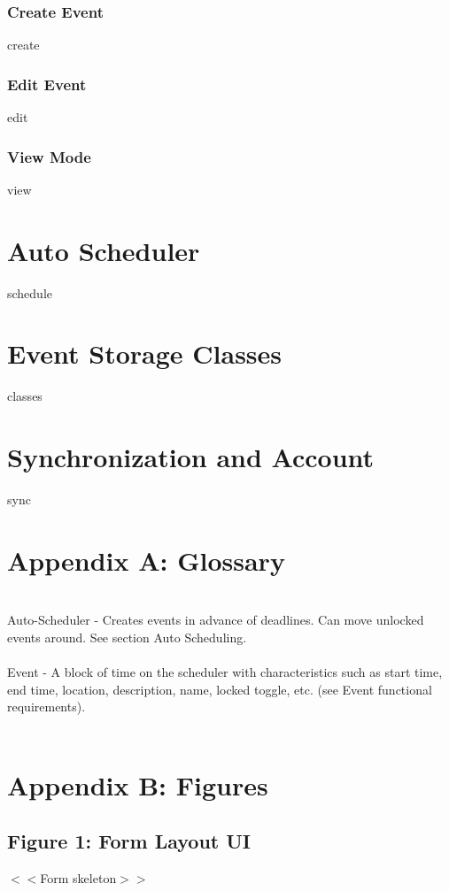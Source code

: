 \documentclass{scrreprt}
\begin{document}
\subsection{Create Event}

create

\subsection{Edit Event}

edit

\subsection{View Mode}

view

\chapter{Auto Scheduler}

schedule

\chapter{Event Storage Classes}

classes

\chapter{Synchronization and Account}

sync

\chapter{Appendix A: Glossary}
\\
Auto-Scheduler - Creates events in advance of deadlines. Can move unlocked events around.
See section Auto Scheduling.\\
\\
Event - A block of time on the scheduler with characteristics such as start time, end time,
location, description, name, locked toggle, etc. (see Event functional requirements).\\
\\
\chapter{Appendix B: Figures}

\section{Figure 1: Form Layout UI}

$<$$<$Form skeleton$>$$>$
\end{document}
